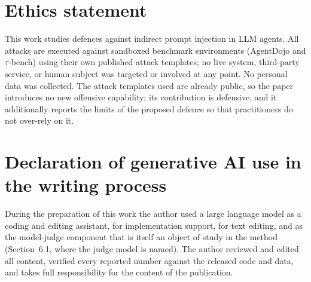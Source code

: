 \documentclass[11pt]{article}
\begin{document}
\section*{Ethics statement}

This work studies defences against indirect prompt injection in LLM agents. All
attacks are executed against sandboxed benchmark environments
(AgentDojo and $\tau$-bench) using their own published attack templates; no live
system, third-party service, or human subject was targeted or involved at any
point. No personal data was collected. The attack templates used are already
public, so the paper introduces no new offensive capability; its contribution is
defensive, and it additionally reports the limits of the proposed defence so that
practitioners do not over-rely on it.

\section*{Declaration of generative AI use in the writing process}

During the preparation of this work the author used a large language model as a
coding and editing assistant, for implementation support, for text editing, and as
the model-judge component that is itself an object of study in the method
(Section~6.1, where the judge model is named). The author reviewed and edited all content, verified every reported
number against the released code and data, and takes full responsibility for the
content of the publication.
\end{document}
